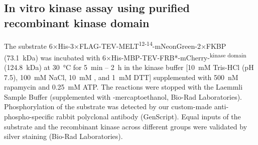 \subsection*{In vitro kinase assay using purified recombinant  kinase domain}
The substrate 6×His-3×FLAG-TEV-MELT\textsuperscript{12-14}-mNeonGreen-2×FKBP (\SI{73.1}{kDa}) was incubated with 6×His-MBP-TEV-FRB*-mCherry-\textsuperscript{kinase domain} (\SI{124.8}{kDa}) at \SI{30}{\celsius} for \SI{5}{min} -- \SI{2}{h} in the kinase buffer [\SI{10}{mM} Tris-HCl (pH 7.5), \SI{100}{mM} NaCl, \SI{10}{mM} , and \SI{1}{mM} DTT] supplemented with \SI{500}{nM} rapamycin and \SI{0.25}{mM} ATP. The reactions were stopped with the Laemmli Sample Buffer (supplemented with \textbeta-mercaptoethanol, Bio-Rad Laboratories). Phosphorylation of the substrate was detected by our custom-made anti- phospho-specific rabbit polyclonal antibody (GenScript). Equal inputs of the substrate and the recombinant kinase across different groups were validated by silver staining (Bio-Rad Laboratories).
